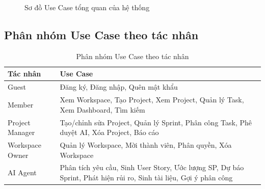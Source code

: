 \documentclass[12pt,a4paper]{report}
\begin{document}
\begin{figure}[H]
\centering
{}
\caption{Sơ đồ Use Case tổng quan của hệ thống}
\label{fig:usecase_overview}
\end{figure}

\subsection{Phân nhóm Use Case theo tác nhân}

\begin{table}[H]
\centering
\caption{Phân nhóm Use Case theo tác nhân}
\begin{tabular}{|p{3.5cm}|p{9cm}|}
\hline
\textbf{Tác nhân} & \textbf{Use Case} \\
\hline
Guest & Đăng ký, Đăng nhập, Quên mật khẩu \\
\hline
Member & Xem Workspace, Tạo Project, Xem Project, Quản lý Task, Xem Dashboard, Tìm kiếm \\
\hline
Project Manager & Tạo/chỉnh sửa Project, Quản lý Sprint, Phân công Task, Phê duyệt AI, Xóa Project, Báo cáo \\
\hline
Workspace Owner & Quản lý Workspace, Mời thành viên, Phân quyền, Xóa Workspace \\
\hline
AI Agent & Phân tích yêu cầu, Sinh User Story, Ước lượng SP, Dự báo Sprint, Phát hiện rủi ro, Sinh tài liệu, Gợi ý phân công \\
\hline
\end{tabular}
\label{tab:usecase_by_actor}
\end{table}
\end{document}
